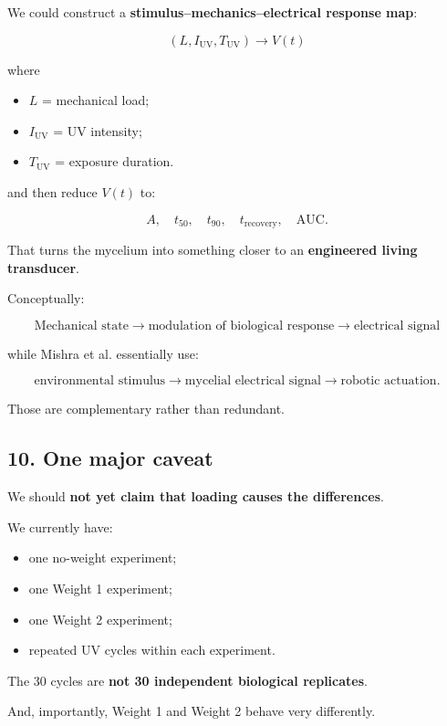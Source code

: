 \documentclass[11pt,a4paper]{article}
\begin{document}
We could construct a \textbf{stimulus--mechanics--electrical response map}:

\[
\boxed{
(L,I_{\mathrm{UV}},T_{\mathrm{UV}})
\longrightarrow
V(t)
}
\]

where

\begin{itemize}
    \item $L$ = mechanical load;
    \item $I_{\mathrm{UV}}$ = UV intensity;
    \item $T_{\mathrm{UV}}$ = exposure duration.
\end{itemize}

and then reduce $V(t)$ to:

\[
A,\quad t_{50},\quad t_{90},\quad
t_{\mathrm{recovery}},\quad \mathrm{AUC}.
\]

That turns the mycelium into something closer to an \textbf{engineered living
transducer}.

Conceptually:

\[
\boxed{
\text{Mechanical state}
\rightarrow
\text{modulation of biological response}
\rightarrow
\text{electrical signal}
}
\]

while Mishra et al. essentially use:

\[
\boxed{
\text{environmental stimulus}
\rightarrow
\text{mycelial electrical signal}
\rightarrow
\text{robotic actuation}.
}
\]

Those are complementary rather than redundant.

\subsection{10. One major caveat}

We should \textbf{not yet claim that loading causes the differences}.

We currently have:

\begin{itemize}
    \item one no-weight experiment;
    \item one Weight 1 experiment;
    \item one Weight 2 experiment;
    \item repeated UV cycles within each experiment.
\end{itemize}

The 30 cycles are \textbf{not 30 independent biological replicates}.

And, importantly, Weight 1 and Weight 2 behave very differently.
\end{document}
